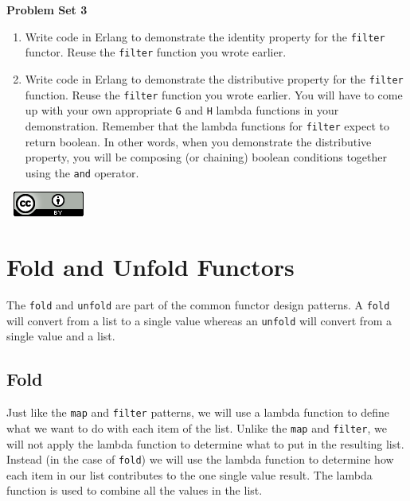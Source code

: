 \documentclass[
]{book}
\providecommand{\tightlist}{%
  \setlength{\itemsep}{0pt}\setlength{\parskip}{0pt}}
\begin{document}
\begin{problembox}

\textbf{Problem Set 3}

\begin{enumerate}
\def\labelenumi{\arabic{enumi}.}
\tightlist
\item
  Write code in Erlang to demonstrate the identity property for the \texttt{filter} functor. Reuse the \texttt{filter} function you wrote earlier.
\item
  Write code in Erlang to demonstrate the distributive property for the \texttt{filter} function. Reuse the \texttt{filter} function you wrote earlier. You will have to come up with your own appropriate \texttt{G} and \texttt{H} lambda functions in your demonstration. Remember that the lambda functions for \texttt{filter} expect to return boolean. In other words, when you demonstrate the distributive property, you will be composing (or chaining) boolean conditions together using the \texttt{and} operator.
\end{enumerate}

\end{problembox}

\(\nonumber\)
\(\nonumber\)
\href{http://creativecommons.org/licenses/by/4.0/}{\includegraphics{images/cc-88x31.png}}

\hypertarget{fold-and-unfold-functors}{%
\chapter{Fold and Unfold Functors}\label{fold-and-unfold-functors}}

The \texttt{fold} and \texttt{unfold} are part of the common functor design patterns. A \texttt{fold} will convert from a list to a single value whereas an \texttt{unfold} will convert from a single value and a list.

\hypertarget{fold}{%
\section{Fold}\label{fold}}

Just like the \texttt{map} and \texttt{filter} patterns, we will use a lambda function to define what we want to do with each item of the list. Unlike the \texttt{map} and \texttt{filter}, we will not apply the lambda function to determine what to put in the resulting list. Instead (in the case of \texttt{fold}) we will use the lambda function to determine how each item in our list contributes to the one single value result. The lambda function is used to combine all the values in the list.
\end{document}

